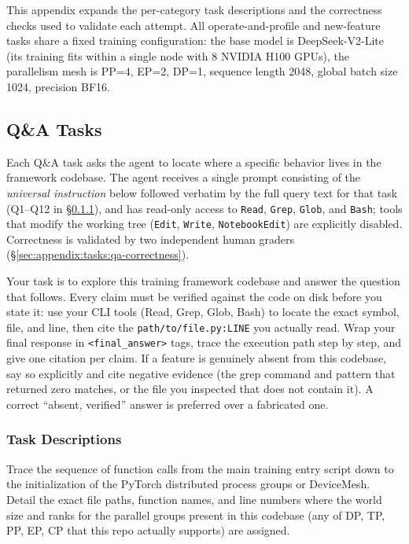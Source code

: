 This appendix expands the per-category task descriptions and the
correctness checks used to validate each attempt. All
operate-and-profile and new-feature tasks share a fixed training
configuration: the base model is
DeepSeek-V2-Lite~\cite{deepseekai2024deepseekv2strongeconomicalefficient}
(its training fits within a single node with 8 NVIDIA H100 GPUs), the
parallelism mesh is PP=4, EP=2, DP=1, sequence length 2048, global
batch size 1024, precision BF16.

\subsection{Q\&A Tasks}
\label{sec:appendix-codebaseqa}

Each Q\&A task asks the agent to locate where a specific behavior
lives in the framework codebase. The agent receives a single
prompt consisting of the \emph{universal instruction} below followed
verbatim by the full query text for that task (Q1--Q12 in
\S\ref{sec:appendix:tasks:qa-descriptions}), and has read-only access
to \texttt{Read}, \texttt{Grep}, \texttt{Glob}, and \texttt{Bash};
tools that modify the working tree (\texttt{Edit}, \texttt{Write},
\texttt{NotebookEdit}) are explicitly disabled. Correctness is
validated by two independent human graders
(\S\ref{sec:appendix:tasks:qa-correctness}).

Your task is to explore this training framework codebase and answer
the question that follows. Every claim must be verified against the
code on disk before you state it: use your CLI tools (Read, Grep,
Glob, Bash) to locate the exact symbol, file, and line, then cite the
\texttt{path/to/file.py:LINE} you actually read. Wrap your final
response in \texttt{<final\_answer>} tags, trace the execution path
step by step, and give one citation per claim. If a feature is
genuinely absent from this codebase, say so explicitly and cite
negative evidence (the grep command and pattern that returned zero
matches, or the file you inspected that does not contain it). A
correct ``absent, verified'' answer is preferred over a fabricated
one.

\subsubsection{Task Descriptions}
\label{sec:appendix:tasks:qa-descriptions}

Trace the sequence of function calls from the main training entry
script down to the initialization of the PyTorch distributed process
groups or DeviceMesh. Detail the exact file paths, function names,
and line numbers where the world size and ranks for the parallel
groups present in this codebase (any of DP, TP, PP, EP, CP that this
repo actually supports) are assigned.

